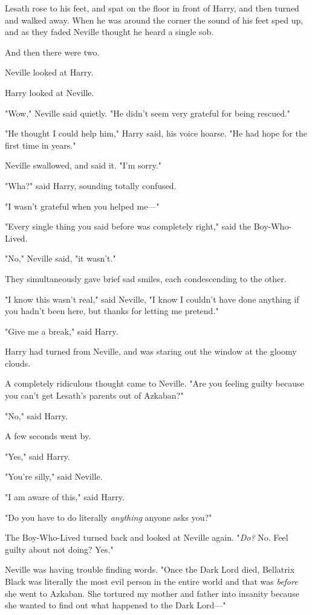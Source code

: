 Lesath rose to his feet, and spat on the floor in front of Harry, and then
turned and walked away. When he was around the corner the sound of his feet
sped up, and as they faded Neville thought he heard a single sob.

And then there were two.

Neville looked at Harry.

Harry looked at Neville.

"Wow," Neville said quietly. "He didn't seem very grateful for being rescued."

"He thought I could help him," Harry said, his voice hoarse. "He had hope for
the first time in years."

Neville swallowed, and said it. "I'm sorry."

"Wha?" said Harry, sounding totally confused.

"I wasn't grateful when you helped me---"

"Every single thing you said before was completely right," said the
Boy-Who-Lived.

"No," Neville said, "it wasn't."

They simultaneously gave brief sad smiles, each condescending to the other.

"I know this wasn't real," said Neville, "I know I couldn't have done anything
if you hadn't been here, but thanks for letting me pretend."

"Give me a break," said Harry.

Harry had turned from Neville, and was staring out the window at the gloomy
clouds.

A completely ridiculous thought came to Neville. "Are you feeling guilty
because you can't get Lesath's parents out of Azkaban?"

"No," said Harry.

A few seconds went by.

"Yes," said Harry.

"You're silly," said Neville.

"I am aware of this," said Harry.

"Do you have to do literally \emph{anything} anyone asks you?"

The Boy-Who-Lived turned back and looked at Neville again. "\emph{Do?} No. Feel
guilty about not doing? Yes."

Neville was having trouble finding words. "Once the Dark Lord died, Bellatrix
Black was literally the most evil person in the entire world and that was
\emph{before} she went to Azkaban. She tortured my mother and father into
insanity because she wanted to find out what happened to the Dark Lord---"

